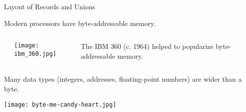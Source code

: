 \documentclass{plt}
\begin{document}
\begin{frame}[fragile]{Layout of Records and Unions}

Modern processors have byte-addressable memory.

\begin{columns}
  \begin{column}{0.1\textwidth}
  \end{column}
  \begin{column}{0.35\textwidth}
    \texttt{[image: ibm\_360.jpg]}
  \end{column}
  \begin{column}{0.4\textwidth}   
    \small The IBM 360 (c. 1964) helped to popularize byte-addressable memory.
  \end{column}
\end{columns}

Many data types (integers, addresses, floating-point numbers) are
wider than a byte.

\hspace{3pc}
\texttt{[image: byte-me-candy-heart.jpg]}

\end{frame}
\end{document}
